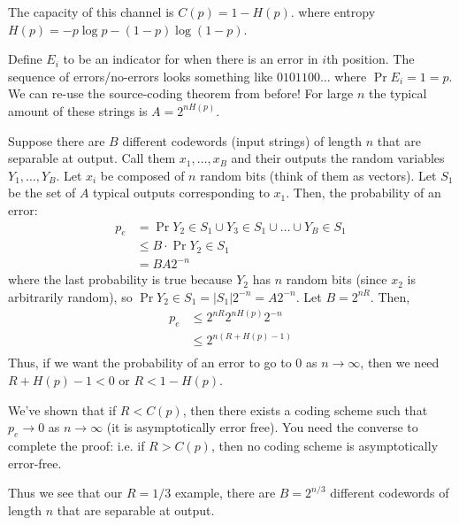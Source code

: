 \begin{theorem}
    The capacity of this channel is $C(p) = 1 - H(p)$. where entropy $H(p) = -p \log p - (1 - p) \log (1- p)$.

    \begin{proof*}
        Define $E_i$ to be an indicator for when there is an error in $i$th position.
        The sequence of errors/no-errors looks something like $0101100\dots$ where $\Pr{E_i = 1} = p$.
        We can re-use the source-coding theorem from before! For large $n$ the typical amount of these strings is
        $A = 2^{nH(p)}$.

        Suppose there are $B$ different codewords (input strings) of length $n$ that are separable at output. Call them
        $x_1, \dots, x_B$ and their outputs the random variables $Y_1, \dots, Y_B$. Let $x_i$ be composed of $n$ random bits (think of them as vectors).
        Let $S_1$ be the set of $A$ typical outputs corresponding to $x_1$. Then, the probability of an error:
        \begin{align*}
            p_e &= \Pr{Y_2 \in S_1 \cup Y_3 \in S_1 \cup \dots \cup Y_B \in S_1} \\
            &\leq B \cdot \Pr{Y_2 \in S_1} \\
            &= B A 2^{-n}
        \end{align*}
        where the last probability is true because $Y_2$ has $n$ random bits (since $x_2$ is arbitrarily random), so $\Pr{Y_2 \in S_1} = |S_1| 2^{-n} = A2^{-n}$.
        Let $B = 2^{nR}$. Then,
        \begin{align*}
            p_e &\leq 2^{nR} 2^{nH(p)} 2^{-n}\\
            &\leq 2^{n(R + H(p) - 1)}\\
        \end{align*}
        Thus, if we want the probability of an error to go to 0 as $n \to \infty$, then we need $R + H(p) - 1 < 0$ or $R < 1 - H(p)$.

        We've shown that if $R < C(p)$, then there exists a coding scheme such that $p_e \to 0$ as $n \to \infty$ (it is asymptotically error free).
        You need the converse to complete the proof: i.e. if $R > C(p)$, then
        no coding scheme is asymptotically error-free.
    \end{proof*}
\end{theorem}

Thus we see that our $R = 1/3$ example, there are $B = 2^{n/3}$ different codewords of length $n$ that are separable at output.

